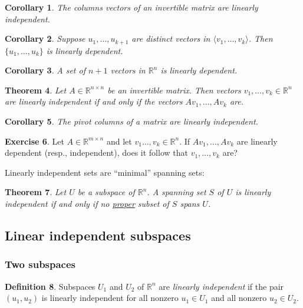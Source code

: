 \documentclass[fullpage]{amsart}
\newcommand{\RR}{\mathbb{R}}
\newtheorem{theorem}{Theorem}[section]
\newtheorem{corollary}[theorem]{Corollary}
\theoremstyle{definition}
\newtheorem{definition}[theorem]{Definition}
\newtheorem{exercise}[theorem]{Exercise}
\begin{document}
\begin{corollary}
  The columns vectors of an invertible matrix are linearly independent.
\end{corollary}

  \begin{corollary} Suppose $u_1,\ldots,u_{k+1}$ are distinct vectors in $\langle v_1,\ldots,v_k\rangle$.
  Then $\{u_1,\ldots,u_k\}$ is linearly dependent.
  \end{corollary}

  \begin{corollary}
    A set of $n+1$ vectors in $\RR^n$ is linearly dependent.
  \end{corollary}

\begin{theorem}
  Let $A\in\RR^{n\times n}$ be an invertible matrix.
  Then vectors $v_1,\ldots,v_k\in\RR^n$ are linearly independent if and only if the vectors $Av_1,\ldots,Av_k$ are.
\end{theorem}

\begin{corollary}
  The pivot columns of a matrix are linearly independent.
\end{corollary}

\begin{exercise}
  Let $A\in\RR^{m\times n}$ and let $v_1\ldots,v_k\in \RR^n$.
  If $Av_1,\ldots,Av_k$ are linearly dependent (resp., independent), does it follow that $v_1,\ldots,v_k$ are?
\end{exercise}

Linearly independent sets are ``minimal'' spanning sets:

\begin{theorem}
  Let $U$ be a subspace of $\RR^n$. A spanning set $S$ of $U$ is linearly independent if and only if no \underline{proper} subset of $S$ spans $U$.
\end{theorem}

\subsection{Linear independent subspaces}
\subsubsection{Two subspaces}

\begin{definition}
  Subspaces $U_1$ and $U_2$ of $\RR^n$ are \emph{linearly independent} if the pair $(u_1, u_2)$ is linearly independent for all nonzero $u_1\in U_1$ and all nonzero $u_2\in U_2$.
\end{definition}
\end{document}
